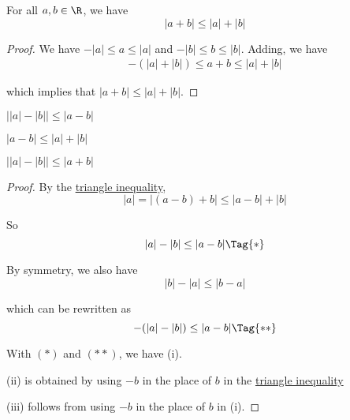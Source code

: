\label{f1288ad}

For all $a,b\in\R$, we have
$$
  |a+b|\leq|a|+|b|
$$

\begin{proof}
  We have $-|a|\leq a\leq|a|$ and $-|b|\leq b\leq|b|$. Adding, we have
  \begin{align*}
    -(|a|+|b|)\leq a+b\leq |a|+|b|
  \end{align*}

  which implies that $|a+b|\leq|a|+|b|$.
\end{proof}

\label{f699f4d}

\begin{enumerati}
  \item $\big||a|-|b|\big|\leq|a-b|$
  \item $|a-b|\leq|a|+|b|$
  \item $\big||a|-|b|\big|\leq|a+b|$
\end{enumerati}

\begin{proof}
  By the \href{f1288ad}{triangle inequality},
  $$
    |a|=|(a-b)+b|\leq|a-b|+|b|
  $$

  So
  \begin{equation*}
    |a|-|b|\leq|a-b|\Tag{*}
  \end{equation*}

  By symmetry, we also have
  $$
    |b|-|a|\leq|b-a|
  $$

  which can be rewritten as
  \begin{equation*}
    -(|a|-|b|)\leq|a-b|\Tag{**}
  \end{equation*}

  With $(*)$ and $(**)$, we have (i).

  (ii) is obtained by using $-b$ in the place of $b$ in the
  \href{f1288ad}{triangle inequality}

  (iii) follows from using $-b$ in the place of $b$ in (i).
\end{proof}
